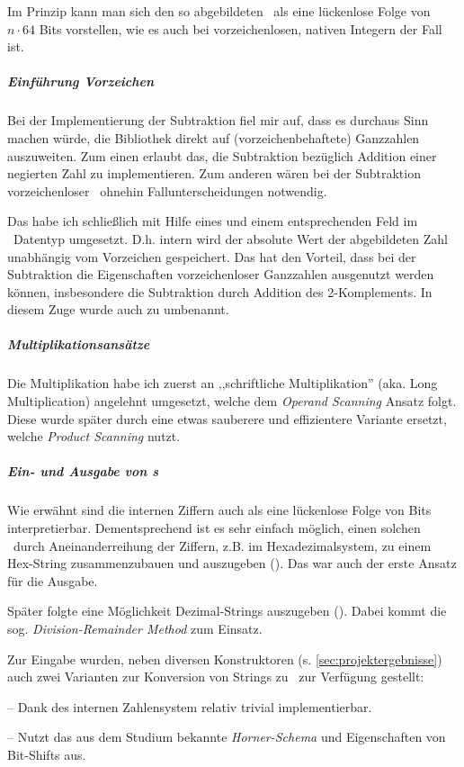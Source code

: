 Im Prinzip kann man sich den so abgebildeten \mpi\ als eine lückenlose Folge von $n \cdot 64$ Bits vorstellen, wie es auch bei vorzeichenlosen, nativen Integern der Fall ist.

\subparagraph*{Einführung Vorzeichen}
Bei der Implementierung der Subtraktion fiel mir auf, dass es durchaus Sinn machen würde, die Bibliothek direkt auf (vorzeichenbehaftete) Ganzzahlen auszuweiten.
Zum einen erlaubt das, die Subtraktion bezüglich Addition einer negierten Zahl zu implementieren.
Zum anderen wären bei der Subtraktion vorzeichenloser \mpi\ ohnehin Fallunterscheidungen notwendig.

Das habe ich schließlich mit Hilfe eines  und einem entsprechenden Feld im \mpi\ Datentyp umgesetzt. D.h. intern wird der absolute Wert der abgebildeten Zahl unabhängig vom Vorzeichen gespeichert. Das hat den Vorteil, dass bei der Subtraktion die Eigenschaften vorzeichenloser Ganzzahlen ausgenutzt werden können, insbesondere die Subtraktion durch Addition des 2-Komplements. In diesem Zuge wurde auch  zu  umbenannt.



\subparagraph*{Multiplikationsansätze} Die Multiplikation habe ich zuerst an ,,schriftliche Multiplikation'' (aka. Long Multiplication) angelehnt umgesetzt, welche dem \emph{Operand Scanning} Ansatz folgt.
Diese wurde später durch eine etwas sauberere und effizientere Variante ersetzt, welche \emph{Product Scanning} nutzt.


\subparagraph*{Ein- und Ausgabe von \mpi{}s}
Wie erwähnt sind die internen Ziffern auch als eine lückenlose Folge von Bits interpretierbar. Dementsprechend ist es sehr einfach möglich, einen solchen \mpi\ durch Aneinanderreihung der Ziffern, z.B. im Hexadezimalsystem, zu einem Hex-String zusammenzubauen und auszugeben (). Das war auch der erste Ansatz für die Ausgabe.

Später folgte eine Möglichkeit Dezimal-Strings auszugeben (). Dabei kommt die sog. \emph{Division-Remainder Method} zum Einsatz.

Zur Eingabe wurden, neben diversen Konstruktoren (s. \autoref{sec:projektergebnisse}) auch zwei Varianten zur Konversion von Strings zu \mpi\ zur Verfügung gestellt:

\begin{description} \tightlist
    \item [\ilc{from\_hex\_str}] -- Dank des internen Zahlensystem relativ trivial implementierbar.
    \item [\ilc{from\_dec\_str}] -- Nutzt das aus dem Studium bekannte \emph{Horner-Schema} und Eigenschaften von Bit-Shifts aus.
\end{description}


